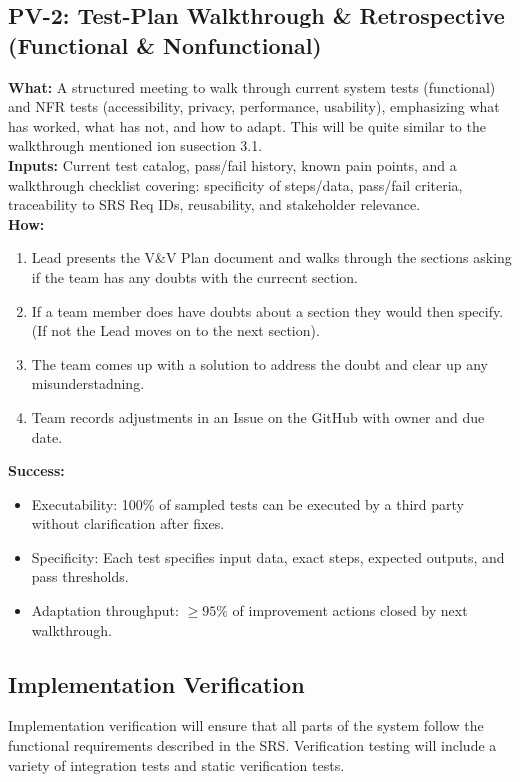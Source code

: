 \documentclass[12pt, titlepage]{article}
\begin{document}
\subsection*{PV-2: Test-Plan Walkthrough \& Retrospective (Functional \& Nonfunctional)}
\textbf{What:} A structured meeting to walk through current system tests (functional) and NFR tests (accessibility, privacy, performance, usability), emphasizing what has worked, what has not, and how to adapt. This will be quite similar to the walkthrough mentioned ion susection 3.1. \\
\textbf{Inputs:} Current test catalog, pass/fail history, known pain points, and a walkthrough checklist covering: specificity of steps/data, pass/fail criteria, traceability to SRS Req IDs, reusability, and stakeholder relevance. \\
\textbf{How:}
\begin{enumerate}
  \item Lead presents the V\&V Plan document and walks through the sections asking if the team has any doubts with the currecnt section.
  \item If a team member does have doubts about a section they would then specify. (If not the Lead moves on to the next section).
  \item The team comes up with a solution to address the doubt and clear up any misunderstadning.
  \item Team records adjustments in an Issue on the GitHub with owner and due date.
\end{enumerate}
\textbf{Success:}
\begin{itemize}
  \item Executability: 100\% of sampled tests can be executed by a third party without clarification after fixes.
  \item Specificity: Each test specifies input data, exact steps, expected outputs, and pass thresholds.
  \item Adaptation throughput: $\geq 95\%$ of improvement actions closed by next walkthrough.
\end{itemize}

\subsection{Implementation Verification}

Implementation verification will ensure that all parts of the system follow the functional requirements described in the SRS. Verification testing will include a variety of integration tests and static verification tests.  
\end{document}
